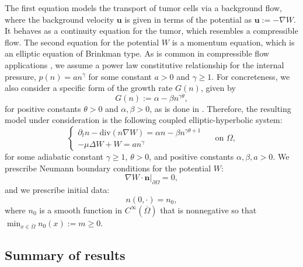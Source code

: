 \documentclass[12pt]{article}
\newcommand{\bd}{\boldsymbol}
\theoremstyle{plain}
\begin{document}
The first equation models the transport of tumor cells via a background flow, where the background velocity $\bd{u}$ is given in terms of the potential as $\bd{u} := -\nabla W$. It behaves as a continuity equation for the tumor, which resembles a compressible flow. The second equation for the potential $W$ is a momentum equation, which is an elliptic equation of Brinkman type. As is common in compressible flow applications \cite{FeireislCompressible, LionsBook}, we assume a power law constitutive relationship for the internal pressure, $p(n) = an^{\gamma}$ for some constant $a > 0$ and $\gamma \ge 1$. For concreteness, we also consider a specific form of the growth rate $G(n)$, given by
\begin{equation}\label{Gdef}
G(n) := \alpha - \beta n^{\gamma \theta},
\end{equation}
for positive constants $\theta > 0$ and $\alpha, \beta > 0$, as is done in \cite{WeberTrivisa}. Therefore, the resulting model under consideration is the following coupled elliptic-hyperbolic system:
\begin{equation}\label{equations}
\begin{cases}
    \partial_{t}n - \text{div}(n\nabla W) = \alpha n - \beta n^{\gamma \theta + 1} \\
    -\mu \Delta W + W = an^{\gamma}
\end{cases} \quad \text{ on } \Omega,
\end{equation}
for some adiabatic constant $\gamma \ge 1$, $\theta > 0$, and positive constants $\alpha, \beta, a > 0$. We prescribe Neumann boundary conditions for the potential $W$:
\begin{equation*}
\nabla W \cdot \bd{n}|_{\partial \Omega} = 0,
\end{equation*}
and we prescribe initial data:
\begin{equation*}
n(0, \cdot) = n_{0},
\end{equation*}
where $n_{0}$ is a smooth function in $C^{\infty}(\overline{\Omega})$ that is nonnegative so that $\displaystyle \min_{x \in \overline{\Omega}} n_{0}(x) := m \ge 0.$ 

\subsection{Summary of results}
\end{document}
